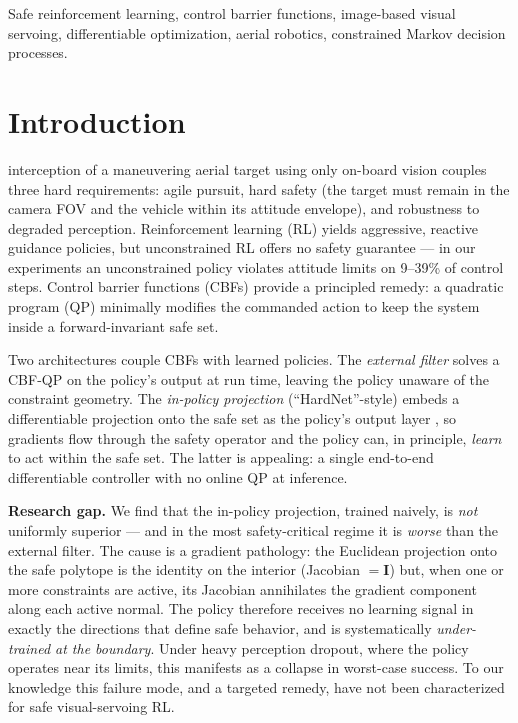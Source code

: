 \documentclass[journal]{IEEEtran}
\begin{document}
\begin{IEEEkeywords}
Safe reinforcement learning, control barrier functions, image-based visual
servoing, differentiable optimization, aerial robotics, constrained Markov
decision processes.
\end{IEEEkeywords}

\section{Introduction}
 interception of a maneuvering aerial target using
only on-board vision couples three hard requirements: agile pursuit, hard
safety (the target must remain in the camera FOV and the vehicle within its
attitude envelope), and robustness to degraded perception. Reinforcement
learning (RL) yields aggressive, reactive guidance policies, but unconstrained
RL offers no safety guarantee --- in our experiments an unconstrained policy
violates attitude limits on 9--39\% of control steps. Control barrier
functions (CBFs) \cite{ames2017cbf,ames2019cbf} provide a principled remedy:
a quadratic program (QP) minimally modifies the commanded action to keep the
system inside a forward-invariant safe set.

Two architectures couple CBFs with learned policies. The \emph{external
filter} solves a CBF-QP on the policy's output at run time, leaving the policy
unaware of the constraint geometry. The \emph{in-policy projection}
(``HardNet''-style) embeds a differentiable projection onto the safe set as
the policy's output layer \cite{amos2017optnet,donti2021dc3}, so gradients
flow through the safety operator and the policy can, in principle,
\emph{learn} to act within the safe set. The latter is appealing: a single
end-to-end differentiable controller with no online QP at inference.

\textbf{Research gap.} We find that the in-policy projection, trained naively,
is \emph{not} uniformly superior --- and in the most safety-critical regime it
is \emph{worse} than the external filter. The cause is a gradient pathology:
the Euclidean projection onto the safe polytope is the identity on the
interior (Jacobian $=\mathbf I$) but, when one or more constraints are active,
its Jacobian annihilates the gradient component along each active normal. The
policy therefore receives no learning signal in exactly the directions that
define safe behavior, and is systematically \emph{under-trained at the
boundary}. Under heavy perception dropout, where the policy operates near its
limits, this manifests as a collapse in worst-case success. To our knowledge
this failure mode, and a targeted remedy, have not been characterized for
safe visual-servoing RL.
\end{document}
